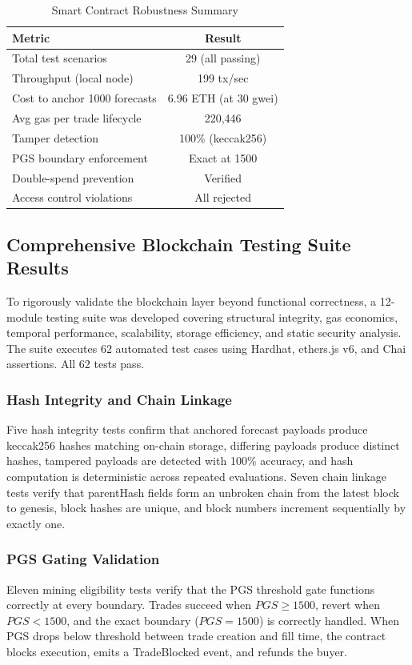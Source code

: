 \documentclass{ieeeaccess}
\begin{document}
\begin{table}[!t]
\caption{Smart Contract Robustness Summary}
\label{tab:robustness_summary}
\centering
\begin{tabular}{lc}
\toprule
Metric & Result \\
\midrule
Total test scenarios & 29 (all passing) \\
Throughput (local node) & 199 tx/sec \\
Cost to anchor 1000 forecasts & 6.96 ETH (at 30 gwei) \\
Avg gas per trade lifecycle & 220,446 \\
Tamper detection & 100\% (keccak256) \\
PGS boundary enforcement & Exact at 1500 \\
Double-spend prevention & Verified \\
Access control violations & All rejected \\
\bottomrule
\end{tabular}
\end{table}

\subsection{Comprehensive Blockchain Testing Suite Results}
To rigorously validate the blockchain layer beyond functional correctness, a 12-module testing suite was developed covering structural integrity, gas economics, temporal performance, scalability, storage efficiency, and static security analysis. The suite executes 62 automated test cases using Hardhat, ethers.js v6, and Chai assertions. All 62 tests pass.

\subsubsection{Hash Integrity and Chain Linkage}
Five hash integrity tests confirm that anchored forecast payloads produce keccak256 hashes matching on-chain storage, differing payloads produce distinct hashes, tampered payloads are detected with 100\% accuracy, and hash computation is deterministic across repeated evaluations. Seven chain linkage tests verify that parentHash fields form an unbroken chain from the latest block to genesis, block hashes are unique, and block numbers increment sequentially by exactly one.

\subsubsection{PGS Gating Validation}
Eleven mining eligibility tests verify that the PGS threshold gate functions correctly at every boundary. Trades succeed when $PGS \ge 1500$, revert when $PGS < 1500$, and the exact boundary ($PGS = 1500$) is correctly handled. When PGS drops below threshold between trade creation and fill time, the contract blocks execution, emits a TradeBlocked event, and refunds the buyer.
\end{document}
